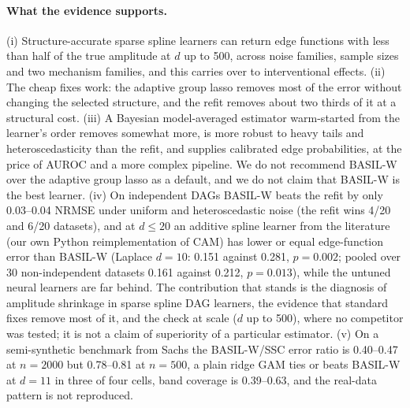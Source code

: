 \documentclass[11pt,a4paper]{article}
\begin{document}
\paragraph{What the evidence supports.} (i) Structure-accurate sparse spline learners can return edge functions with less than half of the true amplitude at $d$ up to 500, across noise families, sample sizes and two mechanism families, and this carries over to interventional effects. (ii) The cheap fixes work: the adaptive group lasso removes most of the error without changing the selected structure, and the refit removes about two thirds of it at a structural cost. (iii) A Bayesian model-averaged estimator warm-started from the learner's order removes somewhat more, is more robust to heavy tails and heteroscedasticity than the refit, and supplies calibrated edge probabilities, at the price of AUROC and a more complex pipeline. We do not recommend BASIL-W over the adaptive group lasso as a default, and we do not claim that BASIL-W is the best learner. (iv) On independent DAGs BASIL-W beats the refit by only 0.03--0.04 NRMSE under uniform and heteroscedastic noise (the refit wins 4/20 and 6/20 datasets), and at $d\le20$ an additive spline learner from the literature (our own Python reimplementation of CAM) has lower or equal edge-function error than BASIL-W (Laplace $d=10$: 0.151 against 0.281, $p=0.002$; pooled over 30 non-independent datasets 0.161 against 0.212, $p=0.013$), while the untuned neural learners are far behind. The contribution that stands is the diagnosis of amplitude shrinkage in sparse spline DAG learners, the evidence that standard fixes remove most of it, and the check at scale ($d$ up to 500), where no competitor was tested; it is not a claim of superiority of a particular estimator. (v) On a semi-synthetic benchmark from Sachs the BASIL-W/SSC error ratio is 0.40--0.47 at $n=2000$ but 0.78--0.81 at $n=500$, a plain ridge GAM ties or beats BASIL-W at $d=11$ in three of four cells, band coverage is 0.39--0.63, and the real-data pattern is not reproduced.
\end{document}
